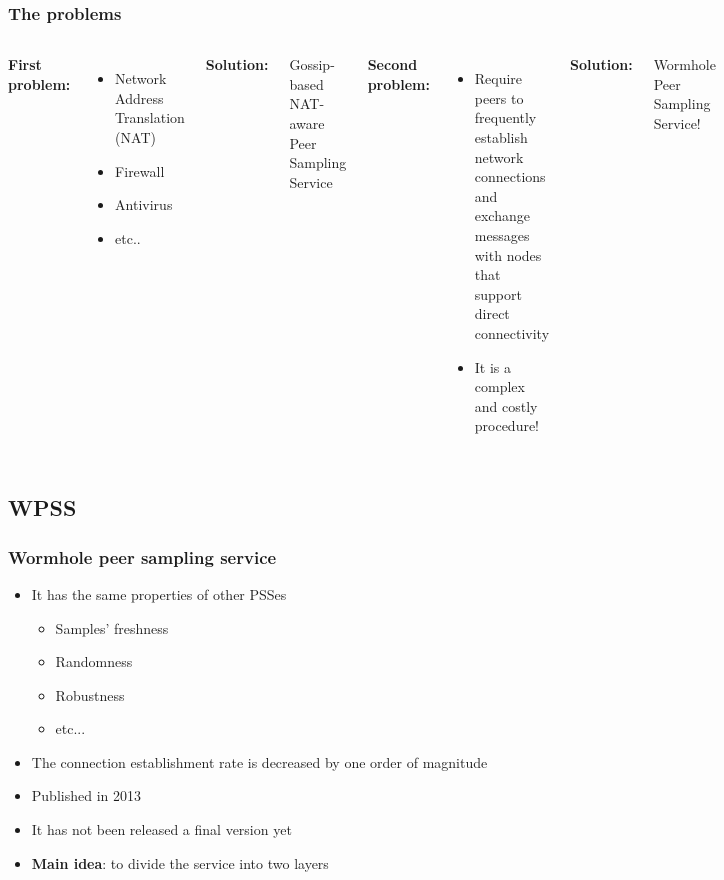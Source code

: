 \documentclass{beamer}
\begin{document}
\begin{frame}
\frametitle{The problems}
\begin{columns}[t] %

\textbf{First problem:}

\begin{itemize}
	\item Network Address Translation (NAT)
	\item Firewall
	\item Antivirus
	\item etc..
\end{itemize}

\textbf{Solution:}

Gossip-based NAT-aware Peer Sampling Service~\cite{gozar}~\cite{croupier}

\textbf{Second problem:}
\begin{itemize}
	\item Require peers to frequently establish network connections and exchange messages with nodes that support direct connectivity
	\item It is a complex and costly procedure!
\end{itemize}
\textbf{Solution:}

Wormhole Peer Sampling Service!~\cite{wormhole}

\end{columns}
\end{frame}

\subsection{WPSS}

\begin{frame}
\frametitle{Wormhole peer sampling service}
\begin{itemize}
  \item It has the same properties of other PSSes 
  \begin{itemize}
    \item Samples' freshness
    \item Randomness
    \item Robustness
    \item etc...
  \end{itemize}
  \item The connection establishment rate is decreased by one order of magnitude
	\item Published in 2013
  \item It has not been released a final version yet
	\item \textbf{Main idea}: to divide the service into two layers
\end{itemize}
\end{frame}
\end{document}
